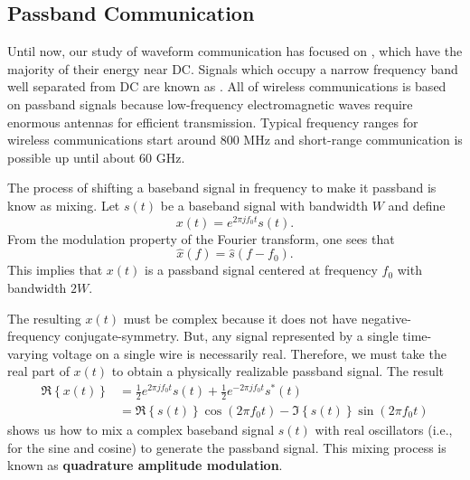 \subsection{Passband Communication}

Until now, our study of waveform communication has focused on , which have the majority of their energy near DC.
Signals which occupy a narrow frequency band well separated from DC are known as .
All of wireless communications is based on passband signals because low-frequency electromagnetic waves require enormous antennas for efficient transmission.
Typical frequency ranges for wireless communications start around 800 MHz and short-range communication is possible up until about 60 GHz.

The process of shifting a baseband signal in frequency to make it passband is know as mixing.
Let $s(t)$ be a baseband signal with bandwidth $W$ and define
\[ x(t) = e^{2\pi j f_0 t} s(t). \]
From the modulation property of the Fourier transform, one sees that
\[ \hat{x}(f) = \hat{s}(f-f_0). \]
This implies that $x(t)$ is a passband signal centered at frequency $f_0$ with bandwidth $2W$.

The resulting $x(t)$ must be complex because it does not have negative-frequency conjugate-symmetry.
But, any signal represented by a single time-varying voltage on a single wire is necessarily real.
Therefore, we must take the real part of $x(t)$ to obtain a physically realizable passband signal.
The result
\begin{align*}
\Re \left\{ x(t) \right \}
& = \frac{1}{2} e^{2\pi j f_0 t} s(t) + \frac{1}{2}  e^{-2\pi j f_0 t} s^* (t) \\
& = \Re \left\{ s(t) \right\} \cos(2 \pi f_0 t) - \Im \left\{ s(t) \right\} \sin (2\pi f_0 t)
\end{align*}
shows us how to mix a complex baseband signal $s(t)$ with real oscillators (i.e., for the sine and cosine) to generate the passband signal.
This mixing process is known as \textbf{quadrature amplitude modulation}.

